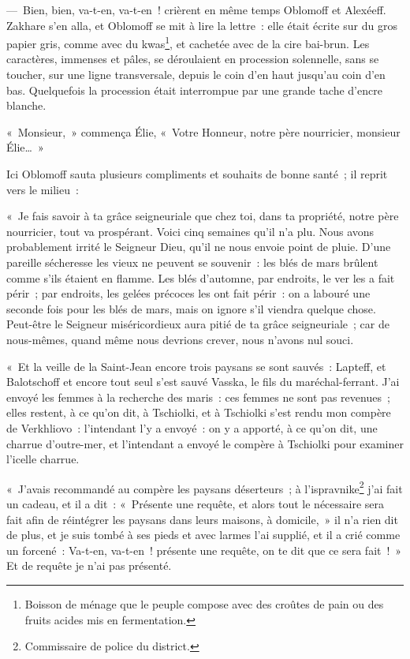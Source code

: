 \documentclass[french,twoside]{book} %
\begin{document}
— Bien, bien, va-t-en, va-t-en ! crièrent en même temps Oblomoff et Alexéeff. Zakhare s’en alla, et Oblomoff se mit à lire la lettre : elle était écrite sur du gros papier gris, comme avec du kwas\footnote{Boisson de ménage que le peuple compose avec des croûtes de pain ou des fruits acides mis en fermentation.}, et cachetée avec de la cire bai-brun. Les caractères, immenses et pâles, se déroulaient en procession solennelle, sans se toucher, sur une ligne transversale, depuis le coin d’en haut jusqu’au coin d’en bas. Quelquefois la procession était interrompue par une grande tache d’encre blanche.\par
« Monsieur, » commença Élie, « Votre Honneur, notre père nourricier, monsieur Élie… »\par
Ici Oblomoff sauta plusieurs compliments et souhaits de bonne santé ; il reprit vers le milieu :\par
« Je fais savoir à ta grâce seigneuriale que chez toi, dans ta propriété, notre père nourricier, tout va prospérant. Voici cinq semaines qu’il n’a plu. Nous avons probablement irrité le Seigneur Dieu, qu’il ne nous envoie point de pluie. D’une pareille sécheresse les vieux ne peuvent se souvenir : les blés de mars brûlent comme s’ils étaient en flamme. Les blés d’automne, par endroits, le ver les a fait périr ; par endroits, les gelées précoces les ont fait périr : on a labouré une seconde fois pour les blés de mars, mais on ignore s’il viendra quelque chose. Peut-être le Seigneur miséricordieux aura pitié de ta grâce seigneuriale ; car de nous-mêmes, quand même nous devrions crever, nous n’avons nul souci.\par
« Et la veille de la Saint-Jean encore trois paysans se sont sauvés : Lapteff, et Balotschoff et encore tout seul s’est sauvé Vasska, le fils du maréchal-ferrant. J’ai envoyé les femmes à la recherche des maris : ces femmes ne sont pas revenues ; elles restent, à ce qu’on dit, à Tschiolki, et à Tschiolki s’est rendu mon compère de Verkhliovo : l’intendant l’y a envoyé : on y a apporté, à ce qu’on dit, une charrue d’outre-mer, et l’intendant a envoyé le compère à Tschiolki pour examiner l’icelle charrue.\par
« J’avais recommandé au compère les paysans déserteurs ; à l’ispravnike\footnote{Commissaire de police du district.} j’ai fait un cadeau, et il a dit : « Présente une requête, et alors tout le nécessaire sera fait afin de réintégrer les paysans dans leurs maisons, à domicile, » il n’a rien dit de plus, et je suis tombé à ses pieds et avec larmes l’ai supplié, et il a crié comme un forcené : Va-t-en, va-t-en ! présente une requête, on te dit que ce sera fait ! » Et de requête je n’ai pas présenté.\par
\end{document}
